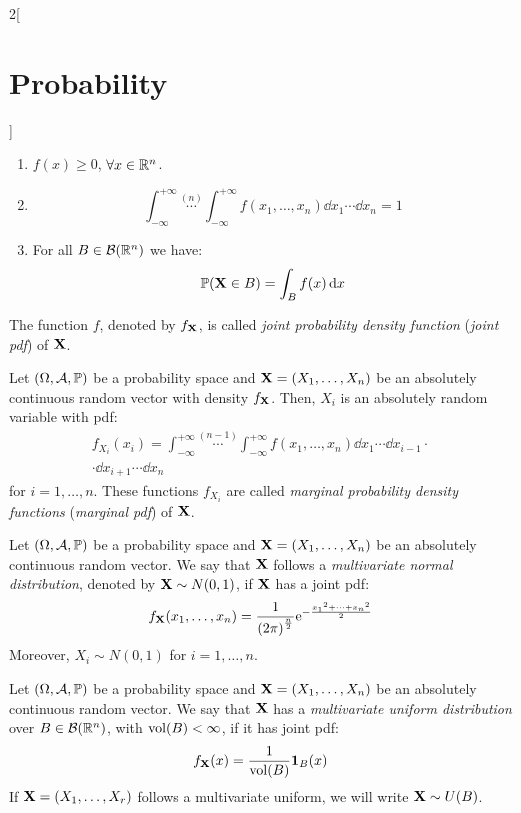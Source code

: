 \documentclass[../../../main_math.tex]{subfiles}
\begin{document}
\begin{multicols}{2}[\section{Probability}]
\begin{definition}
    \begin{enumerate}
      \item $f(x)\geq 0$, $\forall x\in\mathbb{R}^n$.
      \item \hfill $$\int_{-\infty}^{+\infty}\overset{(n)}{\cdots}\int_{-\infty}^{+\infty} f(x_1,\ldots,x_n)\dd{x_1}\cdots\dd{x_n}=1$$
      \item For all $B\in\mathcal{B}(\mathbb{R}^n)$ we have: $$\mathbb{P}(\boldsymbol{\mathrm{X}}\in B)=\int_Bf(x)\dd{x}$$
    \end{enumerate}
    The function $f$, denoted by $f_{\boldsymbol{\mathrm{X}}}$, is called \emph{joint probability density function} (\emph{joint pdf}) of $\boldsymbol{\mathrm{X}}$.
  \end{definition}
  \begin{proposition}
    Let $(\Omega,\mathcal{A},\mathbb{P})$ be a probability space and $\boldsymbol{\mathrm{X}}=(X_1,\ldots,X_n)$ be an absolutely continuous random vector with density $f_{\boldsymbol{\mathrm{X}}}$. Then, $X_i$ is an absolutely random variable with pdf:
    \begin{multline*}
      f_{X_i}(x_i)=\int_{-\infty}^{+\infty}\overset{(n-1)}{\cdots}\int_{-\infty}^{+\infty} f(x_1,\ldots,x_n)\dd{x_1}\cdots\dd{x_{i-1}}\cdot\\\cdot\dd{x_{i+1}}\cdots\dd{x_n}
    \end{multline*}
    for $i=1,\ldots, n$. These functions $f_{X_i}$ are called \emph{marginal probability density functions} (\emph{marginal pdf}) of $\boldsymbol{\mathrm{X}}$.
  \end{proposition}
  \begin{definition}
    Let $(\Omega,\mathcal{A},\mathbb{P})$ be a probability space and $\boldsymbol{\mathrm{X}}=(X_1,\ldots,X_n)$ be an absolutely continuous random vector. We say that $\boldsymbol{\mathrm{X}}$ follows a \emph{multivariate normal distribution}, denoted by $\boldsymbol{\mathrm{X}}\sim N(0,1)$, if $\boldsymbol{\mathrm{X}}$ has a joint pdf: $$f_{\boldsymbol{\mathrm{X}}}(x_1,\ldots,x_n)=\frac{1}{{(2\pi)}^{\frac{n}{2}}}\mathrm{e}^{-\frac{{x_1}^2+\cdots+{x_n}^2}{2}}$$ Moreover, $X_i\sim N(0,1)$ for $i=1,\ldots,n$.
  \end{definition}
  \begin{definition}
    Let $(\Omega,\mathcal{A},\mathbb{P})$ be a probability space and $\boldsymbol{\mathrm{X}}=(X_1,\ldots,X_n)$ be an absolutely continuous random vector. We say that $\boldsymbol{\mathrm{X}}$ has a \emph{multivariate uniform distribution} over $B\in\mathcal{B}(\mathbb{R}^n)$, with $\operatorname{vol}(B)<\infty$, if it has joint pdf: $$f_{\boldsymbol{\mathrm{X}}}(x)=\frac{1}{\operatorname{vol}(B)}\boldsymbol{\mathrm{1}}_{B}(x)$$ If $\boldsymbol{\mathrm{X}}=(X_1,\ldots,X_r)$ follows a multivariate uniform, we will write $\boldsymbol{\mathrm{X}}\sim U(B)$.

\end{definition}
\end{multicols}
\end{document}
